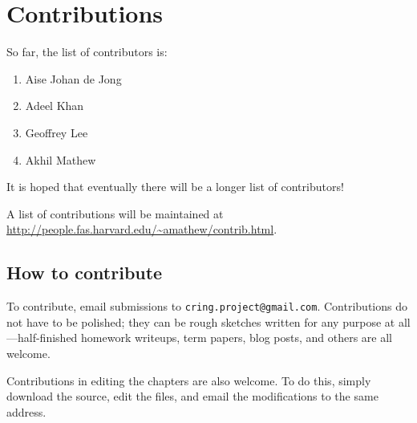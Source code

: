 \chapter*{Contributions}

So far, the list of contributors is:
\begin{enumerate}
\item Aise Johan de Jong
\item Adeel Khan 
\item Geoffrey Lee
\item Akhil Mathew
\end{enumerate}

It is hoped that eventually there will be a longer list of contributors!

A list of contributions will be maintained at 
\url{http://people.fas.harvard.edu/~amathew/contrib.html}.

\section*{How to contribute}


To contribute, email submissions to \verb=cring.project@gmail.com=. 
Contributions do not have to be polished; they can be rough sketches written
for any purpose at all---half-finished homework writeups, term papers, blog
posts, and others are all welcome.

Contributions in editing the chapters are also welcome. To do this, simply
download the source, edit the files, and email the modifications to the same
address.


\fancyfoot[C]{\small \textbf{\thepage}}


